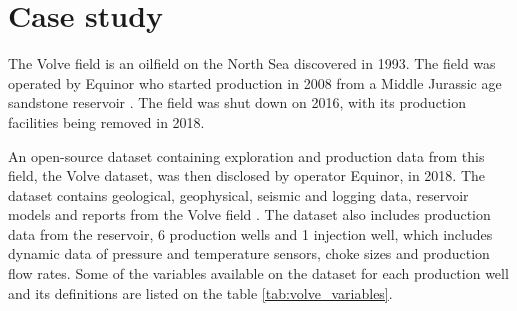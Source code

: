 \documentclass[conference]{IEEEtran}
\begin{document}
\section{Case study}\label{sec:section_case_study}

The Volve field is an oilfield on the North Sea discovered in 1993. The field was operated by 
Equinor who started production in 2008 from a Middle Jurassic age sandstone reservoir 
\cite{volve_info}. The field was shut down on 2016, with its production facilities being 
removed in 2018.

An open-source dataset containing exploration and production data from this field, the Volve 
dataset, was then disclosed by operator Equinor, in 2018. The dataset contains geological, 
geophysical, seismic and logging data, reservoir models and reports from the Volve field 
\cite{volve_data}. The dataset also includes production data from the reservoir, 6 production 
wells and 1 injection well, which includes dynamic data of pressure and temperature sensors, 
choke sizes and production flow rates. Some of the variables available on the dataset for each 
production well and its definitions are listed on the table \ref{tab:volve_variables}.
\end{document}
